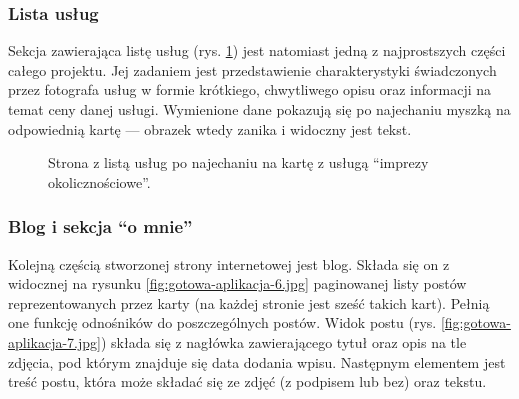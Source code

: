 \documentclass[a4paper, 12pt, twoside]{article}
\numberwithin{figure}{section}
\begin{document}
\begin{sloppypar}
\subsubsection*{Lista usług}

Sekcja zawierająca listę usług (rys. \ref{fig:gotowa-aplikacja-5.jpg}) jest natomiast jedną z najprostszych części całego projektu. Jej zadaniem jest przedstawienie charakterystyki świadczonych przez fotografa usług w formie krótkiego, chwytliwego opisu oraz informacji na temat ceny danej usługi. Wymienione dane pokazują się po najechaniu myszką na odpowiednią kartę --- obrazek wtedy zanika i widoczny jest tekst. 

\begin{figure}[H] 
    \centering
   \caption{Strona z listą usług po najechaniu na kartę z usługą ``imprezy okolicznościowe''.}
   \label{fig:gotowa-aplikacja-5.jpg}
\end{figure}

\subsubsection*{Blog i sekcja ``o mnie''}

Kolejną częścią stworzonej strony internetowej jest blog. Składa się on z widocznej na rysunku \ref{fig:gotowa-aplikacja-6.jpg} paginowanej listy postów reprezentowanych przez karty (na każdej stronie jest sześć takich kart). Pełnią one funkcję odnośników do poszczególnych postów. Widok postu (rys. \ref{fig:gotowa-aplikacja-7.jpg}) składa się z nagłówka zawierającego tytuł oraz opis na tle zdjęcia, pod którym znajduje się data dodania wpisu. Następnym elementem jest treść postu, która może składać się ze zdjęć (z podpisem lub bez) oraz tekstu. 


\end{sloppypar}
\end{document}

